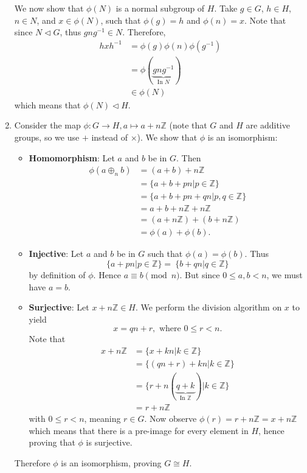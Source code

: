 \begin{enumerate}
    We now show that $\phi(N)$ is a normal subgroup of $H$. Take $g \in G$, $h \in H$, $n \in N$, and $x \in \phi(N)$, such that $\phi(g) = h$ and $\phi(n) = x$. Note that since $N \lhd G$, thus $gng^{-1} \in N$. Therefore,
    \begin{align*}
        hxh^{-1} &= \phi(g)\phi(n)\phi(g^{-1})\\
        &= \phi(\underbrace{gng^{-1}}_{\text{In }N})\\
        &\in \phi(N)
    \end{align*}
    which means that $\phi(N) \lhd H$.

    \item Consider the map $\phi: G \to H, a \mapsto a + n\mathbb{Z}$ (note that $G$ and $H$ are additive groups, so we use $+$ instead of $\times$). We show that $\phi$ is an isomorphism:
    \begin{itemize}
        \item \textbf{Homomorphism}: Let $a$ and $b$ be in $G$. Then
        \begin{align*}
            \phi(a\oplus_n b) &= (a+b) + n\mathbb{Z}\\
            &= \{a+b + pn \vert p \in \mathbb{Z}\}\\
            &= \{a+b + pn + qn\vert p, q \in \mathbb{Z}\}\\
            &= a+b+n\mathbb{Z} + n\mathbb{Z}\\
            &= (a+n\mathbb{Z}) + (b + n\mathbb{Z})\\
            &= \phi(a) + \phi(b).
        \end{align*}
        \item \textbf{Injective}: Let $a$ and $b$ be in $G$ such that $\phi(a) = \phi(b)$. Thus
        \[
            \{a + pn \vert p \in \mathbb{Z} \} = \ \{b + qn \vert q \in \mathbb{Z} \}
        \]
        by definition of $\phi$. Hence $a \equiv b \pmod n$. But since $0 \leq a, b < n$, we must have $a = b$.
        \item \textbf{Surjective}: Let $x + n\mathbb{Z} \in H$. We perform the division algorithm on $x$ to yield
        \[
            x = qn + r, \text{ where } 0 \leq r < n.
        \]
        Note that
        \begin{align*}
            x + n\mathbb{Z} &= \{x + kn \vert k \in \mathbb{Z}\}\\
            &= \{(qn + r) + kn \vert k \in \mathbb{Z}\}\\
            &= \{r + n(\underbrace{q + k}_{\text{In }\mathbb{Z}}) \vert k \in \mathbb{Z} \}\\
            &= r + n\mathbb{Z}
        \end{align*}
        with $0 \leq r < n$, meaning $r \in G$. Now observe $\phi(r) = r+n\mathbb{Z} = x+n\mathbb{Z}$ which means that there is a pre-image for every element in $H$, hence proving that $\phi$ is surjective.
    \end{itemize}
    Therefore $\phi$ is an isomorphism, proving $G \cong H$.
    

\end{enumerate}
